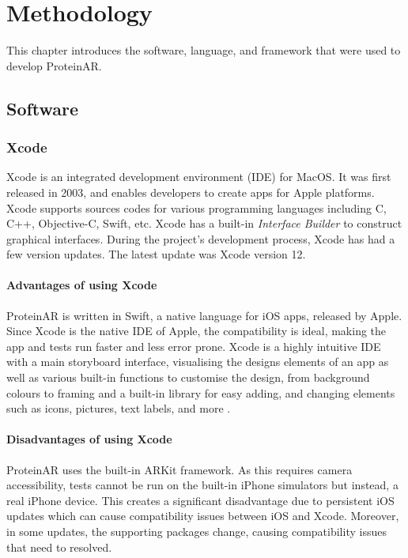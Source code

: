 \chapter{Methodology}
\label{ch:methodology}

This chapter introduces the software, language, and framework that were used to develop ProteinAR.

\section{Software}
	\subsection{Xcode}
Xcode is an integrated development environment (IDE) for MacOS. It was first released in 2003, and enables developers to create apps for Apple platforms. Xcode supports sources codes for various programming languages including C, C++, Objective-C, Swift, etc. Xcode has a built-in \emph{Interface Builder} to construct graphical interfaces. 
During the project's development process, Xcode has had a few version updates. The latest update was Xcode version 12. 
		\subsubsection{Advantages of using Xcode}
ProteinAR is written in Swift, a native language for iOS apps, released by Apple. Since Xcode is the native IDE of Apple, the compatibility is ideal, making the app and tests run faster and less error prone. Xcode is a highly intuitive IDE with a main storyboard interface, visualising the designs elements of an app as well as various built-in functions to customise the design, from background colours to framing and a built-in library for easy adding, and changing elements such as icons, pictures, text labels, and more \parencite{noauthor_xcode_nodate}.

		\subsubsection{Disadvantages of using Xcode}
ProteinAR uses the built-in ARKit framework. As this requires camera accessibility, tests cannot be run on the built-in iPhone simulators but instead, a real iPhone device. This creates a significant disadvantage due to persistent iOS updates which can cause compatibility issues between iOS and Xcode. Moreover, in some updates, the supporting packages change, causing compatibility issues that need to resolved. 

